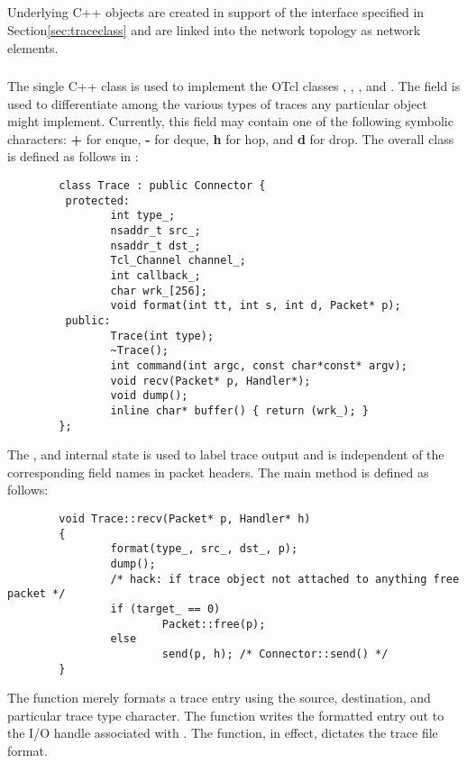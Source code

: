 \subsection{}

Underlying C++ objects are created in support of the interface specified
in Section\ref{sec:traceclass} and are linked into the network topology
as network elements.

\subsubsection{}

The single C++  class is used to implement the OTcl
classes , , ,
and .
The  field is used to differentiate among the
various types of
traces any particular  object might implement.
Currently, this field may contain one of the following symbolic characters:
{\bf +} for enque, {\bf -} for deque, {\bf h} for hop, and
{\bf d} for drop.
The overall class is defined as follows in :
\begin{small}
\begin{verbatim}
        class Trace : public Connector {
         protected:
                int type_;
                nsaddr_t src_;
                nsaddr_t dst_;
                Tcl_Channel channel_;
                int callback_;
                char wrk_[256];
                void format(int tt, int s, int d, Packet* p);
         public:
                Trace(int type);
                ~Trace();
                int command(int argc, const char*const* argv);
                void recv(Packet* p, Handler*);
                void dump();
                inline char* buffer() { return (wrk_); }
        };
\end{verbatim}
\end{small}

The , and  internal state is used
to label trace output and is independent of the corresponding field
names in packet headers.
The main  method is defined as follows:
\begin{small}
\begin{verbatim}
        void Trace::recv(Packet* p, Handler* h)
        {
                format(type_, src_, dst_, p);
                dump();
                /* hack: if trace object not attached to anything free packet */
                if (target_ == 0)
                        Packet::free(p);
                else
                        send(p, h); /* Connector::send() */
        }
\end{verbatim}
\end{small}
The function merely formats a trace entry using the source, destination,
and particular trace type character.
The  function writes the formatted entry out to the
I/O handle associated with .
The  function, in effect, dictates the trace file format.

